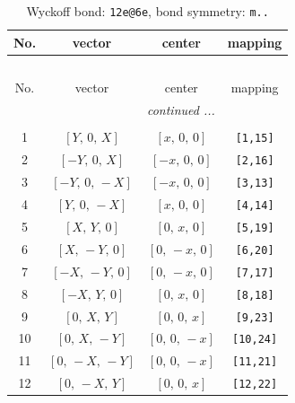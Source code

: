 \documentclass[fleqn,8pt]{jsarticle}
\begin{document}
\begin{longtable}{cccc}
\caption{Wyckoff bond: {\tt 12e@6e}, bond symmetry: {\tt m..}}
 \\
 \hline \hline
No. & vector & center & mapping \\ \hline \endfirsthead

\multicolumn{3}{l}{\tablename\ \thetable{}} \\
 \hline \hline
No. & vector & center & mapping \\ \hline \endhead

 \hline \hline
\multicolumn{3}{r}{\footnotesize\it continued ...} \\ \endfoot

 \hline \hline
\multicolumn{3}{r}{} \\ \endlastfoot

1 & $\left[ Y,\, 0,\, X \right]$ & $\left[ x,\, 0,\, 0 \right]$ & {\tt [1,15]} \\ \hline
2 & $\left[ - Y,\, 0,\, X \right]$ & $\left[ - x,\, 0,\, 0 \right]$ & {\tt [2,16]} \\ \hline
3 & $\left[ - Y,\, 0,\, - X \right]$ & $\left[ - x,\, 0,\, 0 \right]$ & {\tt [3,13]} \\ \hline
4 & $\left[ Y,\, 0,\, - X \right]$ & $\left[ x,\, 0,\, 0 \right]$ & {\tt [4,14]} \\ \hline
5 & $\left[ X,\, Y,\, 0 \right]$ & $\left[ 0,\, x,\, 0 \right]$ & {\tt [5,19]} \\ \hline
6 & $\left[ X,\, - Y,\, 0 \right]$ & $\left[ 0,\, - x,\, 0 \right]$ & {\tt [6,20]} \\ \hline
7 & $\left[ - X,\, - Y,\, 0 \right]$ & $\left[ 0,\, - x,\, 0 \right]$ & {\tt [7,17]} \\ \hline
8 & $\left[ - X,\, Y,\, 0 \right]$ & $\left[ 0,\, x,\, 0 \right]$ & {\tt [8,18]} \\ \hline
9 & $\left[ 0,\, X,\, Y \right]$ & $\left[ 0,\, 0,\, x \right]$ & {\tt [9,23]} \\ \hline
10 & $\left[ 0,\, X,\, - Y \right]$ & $\left[ 0,\, 0,\, - x \right]$ & {\tt [10,24]} \\ \hline
11 & $\left[ 0,\, - X,\, - Y \right]$ & $\left[ 0,\, 0,\, - x \right]$ & {\tt [11,21]} \\ \hline
12 & $\left[ 0,\, - X,\, Y \right]$ & $\left[ 0,\, 0,\, x \right]$ & {\tt [12,22]} \\
\end{longtable}
\renewcommand{\arraystretch}{1.2}
\end{document}
